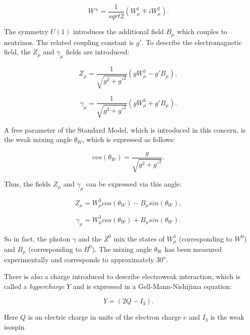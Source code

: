 \begin{equation}
 W^{\pm} = \frac{1}{sqrt{2}}(W_{\mu}^{1} \mp iW_{\mu}^{2}).
\end{equation}

The symmetry $U(1)$ introduces the additional field $B_{\mu}$ which couples to neutrinos. The related coupling constant is $g'$. To describe the electromagnetic
field, the $Z_{\mu}$ and $\gamma_{\mu}$ fields are introduced:

\begin{equation}\label{eq:Zmu}
 Z_{\mu} = \frac{1}{\sqrt{g^{2} + g'^{2}}}(gW^{3}_{\mu} - g'B_{\mu}),
\end{equation}

\begin{equation}\label{eq:Amu}
 \gamma_{\mu} = \frac{1}{\sqrt{g^{2} + g'^{2}}}(gW^{3}_{\mu} + g'B_{\mu}).
\end{equation}

A free parameter of the Standard Model, which is introduced in this concern, is the weak mixing angle $\theta_{W}$, which is expressed as follows:

\begin{equation}
 cos(\theta_{W}) = \frac{g}{\sqrt{g^{2}+g'^{2}}}.
\end{equation}

Thus, the fields $Z_{\mu}$ and $\gamma_{\mu}$ can be expressed via this angle:

\begin{equation}
 Z_{\mu} = W^{3}_{\mu}cos(\theta_{W}) - B_{\mu}sin(\theta_{W}),
\end{equation}

\begin{equation}
 \gamma_{\mu} = W^{3}_{\mu}cos(\theta_{W}) + B_{\mu}sin(\theta_{W}).
\end{equation}

So in fact, the photon $\gamma$ and the $Z^{0}$ mix the states of $W^{3}_{\mu}$ (corresponding to $W^{0}$) and $B_{\mu}$ (corresponding to $B^{0}$).
The mixing angle $\theta_{W}$ has been measured experimentally \cite{PDG-2012} and corresponds to approximately $30^{o}$.

There is also a charge introduced to describe electroweak interaction, which is called a \textit{hypercharge} $Y$ and is expressed in a Gell-Mann-Nishijima
equation:

\begin{equation}
 Y = (2Q - I_{3}).
\end{equation}

Here $Q$ is an electric charge in units of the electron charge $e$ and $I_{3}$ is the weak isospin.

